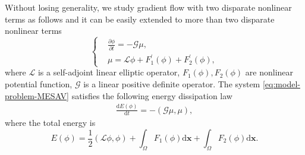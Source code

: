 \documentclass[final,review,onefignum,onetabnum]{siamart190516}
\theoremstyle{plain}
\begin{document}
Without losing generality, we study gradient flow with  two disparate  nonlinear terms as follows and it can be easily extended to more than two disparate nonlinear terms 
\begin{equation} \label{eq:model-problem-MESAV}
	\left\{\begin{aligned}
		& \frac{\partial \phi}{\partial t}=-\mathcal{G} \mu, \\
		& \mu=\mathcal{L} \phi+F_{1}^{\prime}(\phi) + F_{2}^{\prime}(\phi),
	\end{aligned}\right.
\end{equation}
where $\mathcal{L}$  is a self-adjoint  linear  elliptic operator, $F_{1}(\phi), F_{2}(\phi)$ are nonlinear potential function,  $\mathcal{G}$ is a linear positive definite operator.  
The system \eqref{eq:model-problem-MESAV} satisfies the following energy dissipation law
\begin{align}
	\frac{\mathrm{d} E(\phi)}{\mathrm{d} t} =-\left(\mathcal{G}\mu, \mu\right),
\end{align} 
where the total energy is 
\begin{equation}
	E(\phi)=\frac{1}{2}(\mathcal{L} \phi, \phi) + \int_{\Omega} F_{1}(\phi) \mathrm{d} \boldsymbol{x}+\int_{\Omega} F_{2}(\phi) \mathrm{d} \boldsymbol{x}.
\end{equation}
\end{document}
